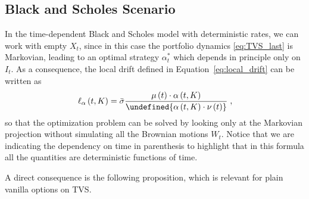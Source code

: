\documentclass[runningheads]{m2ef}
\let\norm\undefined %
\DeclarePairedDelimiter\norm{\lVert}{\rVert}
\newcommand{\change}[1]{{\color{red} {#1}}}%
\begin{document}
\subsection{Black and Scholes \change{Scenario}}\label{subsec:BS_model}
In the time-dependent Black and Scholes model with deterministic rates, we can work with empty $X_t$, since in this case the portfolio dynamics \eqref{eq:TVS_last} is Markovian, leading to an optimal strategy $\alpha_t^*$ which depends in principle only on $I_t$. As a consequence, the local drift defined in Equation~\eqref{eq:local_drift} can be written as
\begin{equation}
     \ell_\alpha \left(t,K\right) = \bar{\sigma}   \frac{\mu\left(t\right) \cdot \alpha\left(t,K\right)}{\norm{\alpha\left(t,K\right) \cdot \nu\left(t\right)}} \; ,  
\end{equation}
so that the optimization problem can be solved by looking only at the Markovian projection without simulating all the Brownian motions $W_t$. Notice that we are indicating the dependency on time in parenthesis to highlight that in this formula all the quantities are deterministic functions of time.

A direct consequence is the following proposition, which is relevant for plain vanilla options on TVS.
\end{document}
